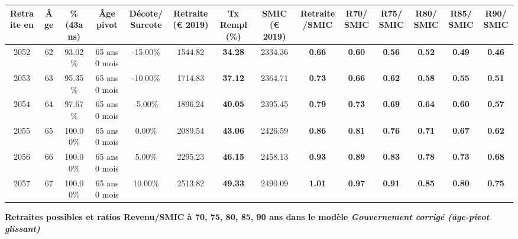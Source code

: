\begin{adjustbox}{max width=\textwidth} 
\begin{tabular}[htb]{|c|c||c|c|c||c|c||c|c||c|c|c|c|c|} 
\hline 
 Retraite en &  Âge &  \%(43ans) &  Âge pivot &  Décote/Surcote &  Retraite (\euro{} 2019) &  Tx Rempl(\%) &  SMIC (\euro{} 2019) &  Retraite/SMIC &  R70/SMIC &  R75/SMIC &  R80/SMIC &  R85/SMIC &  R90/SMIC \\ 
\hline \hline 
 2052 &  62 &  93.02\% &  65 ans 0 mois &  -15.00\% &  1544.82 &  {\bf 34.28} &  2334.36 &  {\bf {\color{red} 0.66}} &  {\bf {\color{red} 0.60}} &  {\bf {\color{red} 0.56}} &  {\bf {\color{red} 0.52}} &  {\bf {\color{red} 0.49}} &  {\bf {\color{red} 0.46}} \\ 
\hline 
 2053 &  63 &  95.35\% &  65 ans 0 mois &  -10.00\% &  1714.83 &  {\bf 37.12} &  2364.71 &  {\bf {\color{red} 0.73}} &  {\bf {\color{red} 0.66}} &  {\bf {\color{red} 0.62}} &  {\bf {\color{red} 0.58}} &  {\bf {\color{red} 0.55}} &  {\bf {\color{red} 0.51}} \\ 
\hline 
 2054 &  64 &  97.67\% &  65 ans 0 mois &  -5.00\% &  1896.24 &  {\bf 40.05} &  2395.45 &  {\bf {\color{red} 0.79}} &  {\bf {\color{red} 0.73}} &  {\bf {\color{red} 0.69}} &  {\bf {\color{red} 0.64}} &  {\bf {\color{red} 0.60}} &  {\bf {\color{red} 0.57}} \\ 
\hline 
 2055 &  65 &  100.00\% &  65 ans 0 mois &  0.00\% &  2089.54 &  {\bf 43.06} &  2426.59 &  {\bf {\color{red} 0.86}} &  {\bf {\color{red} 0.81}} &  {\bf {\color{red} 0.76}} &  {\bf {\color{red} 0.71}} &  {\bf {\color{red} 0.67}} &  {\bf {\color{red} 0.62}} \\ 
\hline 
 2056 &  66 &  100.00\% &  65 ans 0 mois &  5.00\% &  2295.23 &  {\bf 46.15} &  2458.13 &  {\bf {\color{red} 0.93}} &  {\bf {\color{red} 0.89}} &  {\bf {\color{red} 0.83}} &  {\bf {\color{red} 0.78}} &  {\bf {\color{red} 0.73}} &  {\bf {\color{red} 0.68}} \\ 
\hline 
 2057 &  67 &  100.00\% &  65 ans 0 mois &  10.00\% &  2513.82 &  {\bf 49.33} &  2490.09 &  {\bf 1.01} &  {\bf {\color{red} 0.97}} &  {\bf {\color{red} 0.91}} &  {\bf {\color{red} 0.85}} &  {\bf {\color{red} 0.80}} &  {\bf {\color{red} 0.75}} \\ 
\hline 
\hline 
\end{tabular} 
\end{adjustbox} 
 
 \vspace{0.1cm} 
{\bf \noindent Retraites possibles et ratios Revenu/SMIC à 70, 75, 80, 85, 90 ans dans le modèle \emph{Gouvernement corrigé (âge-pivot glissant)}}  
 
